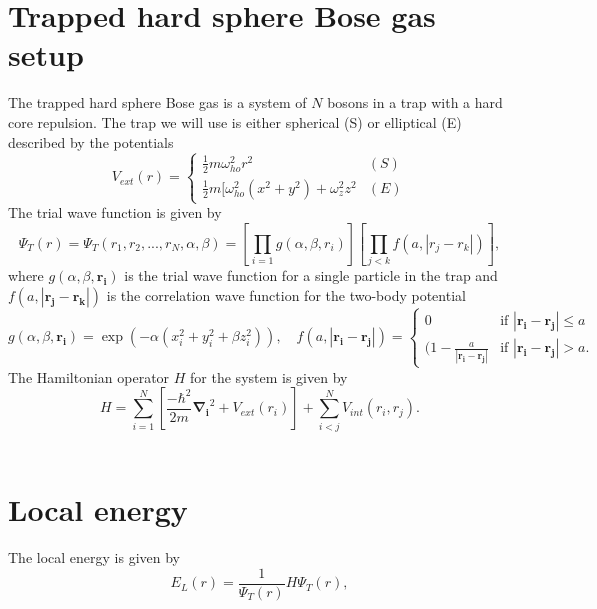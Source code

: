 \section{Trapped hard sphere Bose gas setup}
\label{sec:Trapped hard sphere Bose gas setup}
The trapped hard sphere Bose gas is a system of $N$ bosons in a trap with a hard core repulsion.
The trap we will use is either spherical (S) or elliptical (E) described by the potentials
\begin{equation}
	\label{eq:extpotential}
	V _{ext}(r) =
	{
	\left\{
	\begin{array}{lll}
		\frac{1}{2}m \omega _{ho}^2r^2                      & (S) \\
		\frac{1}{2}m[\omega _{ho}^2(x^2+y^2)+\omega _z^2z^2 & (E)
	\end{array}
	\right.
	}
\end{equation}
The trial wave function is given by
\begin{equation}
	\Psi _T(r) = \Psi _T(r_1, r_2, ..., r_N, \alpha , \beta ) = \left[\prod _{i=1}g(\alpha , \beta , r_i)\right]\left[\prod_{j<k}^{} f(a, |r_j-r_k|)\right],
\end{equation}
where $g(\alpha , \beta , \boldsymbol{r_i})$ is the trial wave function for a single particle in the trap and $f(a, |\boldsymbol{r_j}-\boldsymbol{r_k}|)$ is the correlation wave function for the two-body potential
\begin{equation}
	\label{eq:fgdef}
	g(\alpha, \beta , \boldsymbol{r_i}) = \exp(-\alpha (x_i^2 + y_i^2 + \beta z_i^2)), \quad f(a,|\boldsymbol{r_i}-\boldsymbol{r_j}|)=
	{
	\left\{
	\begin{array}{lll}
		0                                                & \mbox{if } |\boldsymbol{r_i}-\boldsymbol{r_j}| \le a \\
		(1-\frac{a}{|\boldsymbol{r_i}-\boldsymbol{r_j}|} & \mbox{if } |\boldsymbol{r_i}-\boldsymbol{r_j}|>a.
	\end{array}
	\right.
	}
\end{equation}
The Hamiltonian operator $H$ for the system is given by
\begin{equation}
	\label{eq:Hamiltonian operator}
	H = \sum_{i=1}^{N} [\frac{-\hbar^2}{2m} \boldsymbol{\nabla_i}^2 + V _{ext}(r_i)] + \sum_{i<j}^{N} V _{int}(r_i,r_j).
\end{equation}
\
\section{Local energy} %
\label{sec:Local energy}
The local energy is given by
\begin{equation}
	\label{eq:local energy}
	E_L(r) = \frac{1}{\Psi _T(r)}H\Psi _T(r),
\end{equation}
